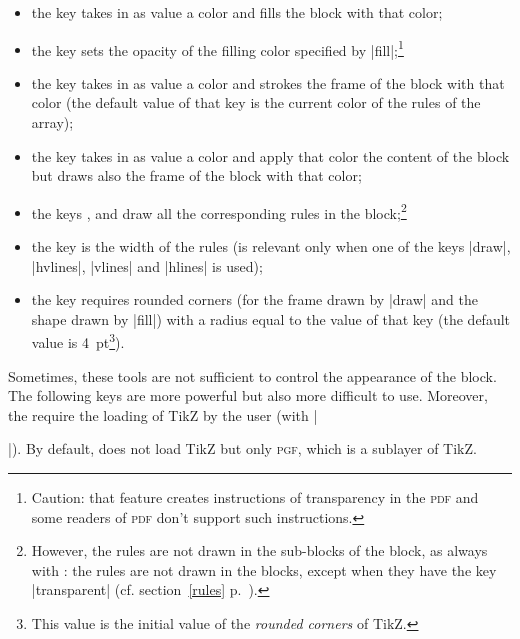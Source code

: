 \documentclass[dvipsnames]{article}%
\begin{document}
\begin{itemize}
\item {}
the key  takes in as value a color and fills the block
with that color;
\item {} 
the key  sets the opacity of the filling color specified by
|fill|;\footnote{Caution: that feature creates instructions of
  transparency in the \textsc{pdf} and some readers of \textsc{pdf} don't
  support such instructions.} 
\item {}
the key  takes in as value a color and strokes the
frame of the block with that color (the default value of that key is the
current color of the rules of the array);
\item {} 
the key  takes in as value a color and apply that
color the content of the block but draws also the frame of the block with that
color;
\item {} 
the keys ,  and
 draw all the corresponding rules in the
block;\footnote{However, the rules are not drawn in the sub-blocks of the
block, as always with : the rules are not drawn in the blocks,
except when they have the key |transparent|
(cf. section~\ref{rules} p.~\pageref{rules}).}
\item {}
the key  is the width of the rules (is relevant
only when one of the keys |draw|, |hvlines|, |vlines| and |hlines| is used);
\item {}
the key  requires rounded corners (for the
frame drawn by |draw| and the shape drawn by |fill|) with a radius equal to
the value of that key (the default value is 4~pt\footnote{This value is the
initial value of the \emph{rounded corners} of TikZ.}).
\end{itemize}

\medskip
Sometimes, these tools are not sufficient to control the appearance of the
block. The following keys are more powerful but also more difficult to use.
Moreover, the require the loading of TikZ by the user (with
|\usepackage{tikz}|). By default,  does not load TikZ but only
\textsc{pgf}, which is a sublayer of TikZ.
\end{document}
